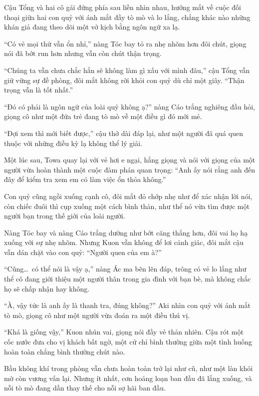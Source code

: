 \documentclass[../main.tex]{subfiles}
\begin{document}
Cậu Tổng và hai cô gái đứng phía sau liền nhìn nhau, hướng mắt về cuộc đối thoại giữa hai con quỷ với ánh mắt đầy tò mò và lo lắng, chẳng khác nào những khán giả đang theo dõi một vở kịch bằng ngôn ngữ xa lạ.

``Có vẻ mọi thứ vẫn ổn nhỉ,'' nàng Tóc bay tỏ ra nhẹ nhõm hơn đôi chút, giọng nói đã bớt run hơn nhưng vẫn còn chút thận trọng.

``Chúng ta vẫn chưa chắc hắn sẽ không làm gì xấu với mình đâu,'' cậu Tổng vẫn giữ vững sự đề phòng, đôi mắt không rời khỏi con quỷ dù chỉ một giây. ``Thận trọng vẫn là tốt nhất.''

``Đó có phải là ngôn ngữ của loài quỷ không ạ?'' nàng Cáo trắng nghiêng đầu hỏi, giọng cô như một đứa trẻ đang tò mò về một điều gì đó mới mẻ.

``Đợi xem thì mới biết được,'' cậu thở dài đáp lại, như một người đã quá quen thuộc với những điều kỳ lạ không thể lý giải.

Một lúc sau, Towa quay lại với vẻ hơi e ngại, hắng giọng và nói với giọng của một người vừa hoàn thành một cuộc đàm phán quan trọng: ``Anh ấy nói rằng anh đến đây để kiểm tra xem em có làm việc ổn thỏa không.''

Con quỷ cũng ngồi xuống cạnh cô, đôi mắt đỏ chớp nhẹ như để xác nhận lời nói, còn chiếc đuôi thì cụp xuống một cách bình thản, như thể nó vừa tìm được một người bạn trong thế giới của loài người.

Nàng Tóc bay và nàng Cáo trắng dường như bớt căng thẳng hơn, đôi vai họ hạ xuống với sự nhẹ nhõm. Nhưng Kuon vẫn không để lơi cảnh giác, đôi mắt cậu vẫn dán chặt vào con quỷ: ``Người quen của em à?''

``Cũng\dots\ có thể nói là vậy ạ,'' nàng Ác ma bẽn lẽn đáp, trông có vẻ lo lắng như thể cô đang giới thiệu một người thân trong gia đình với bạn bè, mà không chắc họ sẽ chấp nhận hay không.

``À, vậy tức là anh ấy là thanh tra, đúng không?'' Aki nhìn con quỷ với ánh mắt tò mò, giọng cô như một người vừa đoán ra một điều thú vị.

``Khá là giống vậy,'' Kuon nhún vai, giọng nói đầy vẻ thản nhiên. Cậu rót một cốc nước đưa cho vị khách bất ngờ, một cử chỉ bình thường giữa một tình huống hoàn toàn chẳng bình thường chút nào.

Bầu không khí trong phòng vẫn chưa hoàn toàn trở lại như cũ, như một làn khói mờ còn vương vấn lại. Nhưng ít nhất, cơn hoảng loạn ban đầu đã lắng xuống, và nỗi tò mò đang dần thay thế cho nỗi sợ hãi ban đầu.
\end{document}
